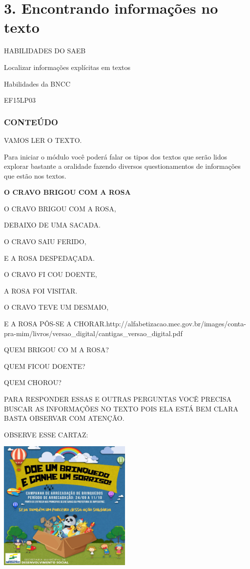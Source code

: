 {{\chapter{3. Encontrando informações no texto}

HABILIDADES DO SAEB

Localizar informações explícitas em textos

Habilidades da BNCC

EF15LP03

\subsection{CONTEÚDO}

VAMOS LER O TEXTO.

Para iniciar o módulo você poderá falar os tipos dos textos que serão
lidos explorar bastante a oralidade fazendo diversos questionamentos de
informações que estão nos textos.

\textbf{O CRAVO BRIGOU COM A ROSA}

O CRAVO BRIGOU COM A ROSA,

DEBAIXO DE UMA SACADA.

O CRAVO SAIU FERIDO,

E A ROSA DESPEDAÇADA.

O CRAVO FI COU DOENTE,

A ROSA FOI VISITAR.

O CRAVO TEVE UM DESMAIO,

E A ROSA PÔS-SE A
CHORAR.http://alfabetizacao.mec.gov.br/images/conta-pra-mim/livros/versao\_digital/cantigas\_versao\_digital.pdf

QUEM BRIGOU CO M A ROSA?

QUEM FICOU DOENTE?

QUEM CHOROU?

PARA RESPONDER ESSAS E OUTRAS PERGUNTAS VOCÊ PRECISA BUSCAR AS
INFORMAÇÕES NO TEXTO POIS ELA ESTÁ BEM CLARA BASTA OBSERVAR COM ATENÇÃO.

OBSERVE ESSE CARTAZ:

\includegraphics[width=2.57847in,height=2.52847in]{media/image82.png}

}}
